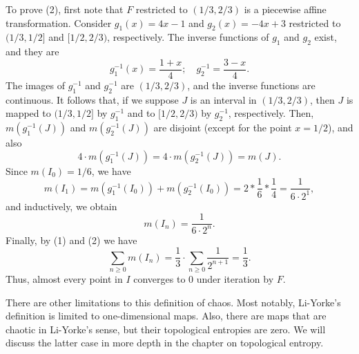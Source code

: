 \documentclass[12pt,draft,twoside]{book}
\begin{document}
\begin{example}
%
To prove (2), first note that $F$ restricted to $(1/3, 2/3)$ is a piecewise affine transformation.
Consider $g_1(x) = 4x - 1$ and $g_2(x) = -4x + 3$ restricted to $(1/3,1/2]$ and $[1/2,2/3)$, respectively.
The inverse functions of $g_1$ and $g_2$ exist, and they are
\begin{equation*}
  g_1^{-1}(x) = \frac{1+x}{4}; \quad g_2^{-1} = \frac{3-x}{4}.
\end{equation*}
The images of $g_1^{-1}$ and $g_2^{-1}$ are $(1/3,2/3)$, and the inverse functions are continuous.
It follows that, if we suppose $J$ is an interval in $(1/3,2/3)$, then $J$ is mapped to $(1/3,1/2]$ by $g_1^{-1}$ and to $[1/2,2/3)$ by $g_2^{-1}$, respectively.
Then, $m(g_1^{-1}(J))$ and $m(g_2^{-1}(J))$ are disjoint (except for the point $x = 1/2$), and also
\begin{equation*}
  4 \cdot m(g_1^{-1}(J)) = 4 \cdot m(g_2^{-1}(J)) = m(J).
\end{equation*}
Since $m(I_0) = 1/6$, we have
\begin{equation*}
  m(I_1) 
  = m(g_1^{-1}(I_0)) + m(g_2^{-1}(I_0))
  = 2 * \frac{1}{6} * \frac{1}{4}
  = \frac{1}{6\cdot 2^1},
\end{equation*}
and inductively, we obtain
\begin{equation*}
  m(I_n) = \frac{1}{6 \cdot 2^n}.
\end{equation*}
%
Finally, by (1) and (2) we have
\begin{equation*}
  \sum\limits_{n\geq 0} m(I_n)
  = \frac{1}{3} \cdot \sum\limits_{n\geq 0} \frac{1}{2^{n+1}}
  = \frac{1}{3}.
\end{equation*}
Thus, almost every point in $I$ converges to 0 under iteration by $F$.
\end{example}


There are other limitations to this definition of chaos.
Most notably, Li-Yorke's definition is limited to one-dimensional maps.
Also, there are maps that are chaotic in Li-Yorke's sense, but their topological entropies are zero.
We will discuss the latter case in more depth in the chapter on topological entropy.




\printindex
\end{document}
